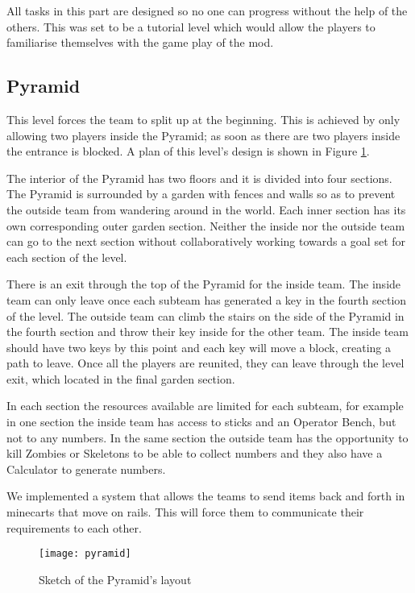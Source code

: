 All tasks in this part are designed so no one can progress without the help of the others. This was set to be a tutorial level which would allow the players to familiarise themselves with the game play of the mod.

\subsection{Pyramid}
This level forces the team to split up at the beginning. This is achieved by only allowing two players inside the Pyramid;
as soon as there are two players inside the entrance is blocked. A plan of this level's design is shown in
Figure \ref{fig:pyramid-layout}.

The interior of the Pyramid has two floors and it is divided into four sections. The Pyramid is surrounded by a garden with fences and walls so as to prevent the outside team from wandering around in the world. Each inner section has its own corresponding outer garden section. Neither the inside nor the outside team can go to the next section without collaboratively working towards a goal set for each section of the level.

There is an exit through the top of the Pyramid for the inside team. The inside team can only leave once each subteam has generated a key in the fourth section of the level. The outside team can climb the stairs on the side of the Pyramid in the fourth section and throw their key inside for the other team. The inside team should have two keys by this point and each key will move a block, creating a path to leave. Once all the players are reunited, they can leave through the level exit, which located in the final garden section.

In each section the resources available are limited for each subteam, for example in one section the inside team has access to sticks and an Operator Bench, but not to any numbers. In the same section the outside team has the opportunity to kill Zombies or Skeletons to be able to collect numbers and they also have a Calculator to generate numbers.

We implemented a system that allows the teams to send items back and forth in minecarts that move on rails. This will force them to communicate their requirements to each other.

\begin{figure}[h!]
\label{fig:pyramid-layout}
\caption{Sketch of the Pyramid's layout}
\centering
\texttt{[image: pyramid]}
\end{figure}

